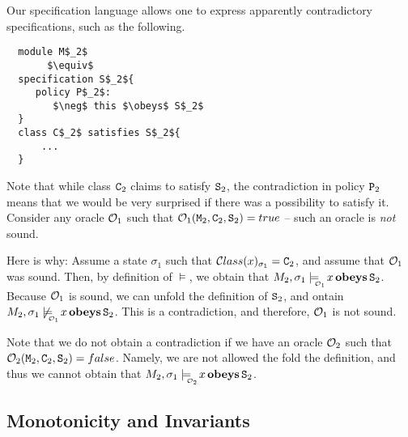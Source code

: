 Our specification language allows one to express apparently contradictory
specifications, such as the following.

 \begin{lstlisting}
  module M$_2$
       $\equiv$
  specification S$_2${
     policy P$_2$:
        $\neg$ this $\obeys$ S$_2$
  }
  class C$_2$ satisfies S$_2${
      ...
  }
\end{lstlisting}

Note that while class ${\textrm{\ttfamily{C}}}_2$ claims to satisfy ${\textrm{\ttfamily{S}}}_2$, the
contradiction in policy ${\textrm{\ttfamily{P}}}_2$ means that we would be very surprised if there was a possibility to satisfy it.
 Consider any oracle ${\cal O}_1$ such that ${\cal O}_1({\textrm{\ttfamily{M}}}_2,{\textrm{\ttfamily{C}}}_2,{\textrm{\ttfamily{S}}}_2)=true$ -- such an oracle is {\em not} sound.

Here is why: Assume a state $\sigma_1$ such that ${\cal C}lass(x)_{\sigma_1}={\textrm{\ttfamily{C}}}_2$, and assume that
${\cal O}_1$ was sound.
Then, by definition of $\models$, we obtain that $\M_2, \sigma_1 \modelsWith{\O_1}  x \obeys \prg{S}_2 $. Because ${\cal O}_1$ is sound, we can unfold the definition of ${\textrm{\ttfamily{S}}}_2$, and ontain $\M_2, \sigma_1 \not\modelsWith{\O_1}  x \obeys \prg{S}_2 $.
This is a contradiction, and therefore, ${\cal O}_1$ is not sound.

Note that we do not obtain a contradiction if we have an oracle  ${\cal O}_2$ such that  ${\cal O}_2({\textrm{\ttfamily{M}}}_2,{\textrm{\ttfamily{C}}}_2,{\textrm{\ttfamily{S}}}_2)=false$. Namely, we are not allowed the fold the definition, and thus we cannot obtain that $\M_2, \sigma_1 \modelsWith{\O_2}  x \obeys \prg{S}_2 $.

%
%

\subsection{Monotonicity and Invariants}

